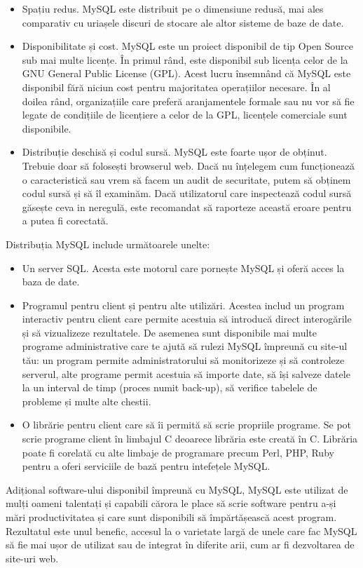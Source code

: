 \documentclass[12pt]{book}
\begin{document}
\begin{addmargin}[4em]{1em}
\begin{itemize}
	\item Spațiu redus. MySQL este distribuit pe o dimensiune redusă, mai ales comparativ cu uriașele discuri de stocare ale altor sisteme de baze de date.
	\item Disponibilitate și cost. MySQL este un proiect disponibil de tip Open Source sub mai multe licențe. În primul rând, este disponibil sub licența celor de la GNU General Public License (GPL). Acest lucru însemnând că MySQL este disponibil fără niciun cost pentru majoritatea operațiilor necesare. În al doilea rând, organizațiile care preferă aranjamentele formale sau nu vor să fie legate de condițiile de licențiere a celor de la GPL, licențele comerciale sunt disponibile.
	\item Distribuție deschisă și codul sursă. MySQL este foarte ușor de obținut. Trebuie doar să folosești browserul web. Dacă nu înțelegem cum funcționează o caracteristică sau vrem să facem un audit de securitate, putem să obținem codul sursă și să îl examinăm. Dacă utilizatorul care inspectează codul sursă găsește ceva in neregulă, este recomandat să raporteze această eroare pentru a putea fi corectată.\cite{mySqlDeveloperLibrary}
\end{itemize}
\end{addmargin}
\bigbreak
Distribuția MySQL include următoarele unelte:
\begin{addmargin}[4em]{1em}
\begin{itemize}
\item Un server SQL. Acesta este motorul care pornește MySQL și oferă acces la baza de date.
\item Programul pentru client și pentru alte utilizări. Acestea includ un program interactiv pentru client care permite acestuia să introducă direct interogările și să vizualizeze rezultatele. De asemenea sunt disponibile mai multe programe administrative care te ajută să rulezi MySQL împreună cu site-ul tău: un program permite administratorului să monitorizeze și să controleze serverul, alte programe permit acestuia să importe date, să își salveze datele la un interval de timp (proces numit back-up), să verifice tabelele de probleme și multe alte chestii.
\item O librărie pentru client care să îi permită să scrie propriile programe. Se pot scrie programe client în limbajul C deoarece librăria este creată în C. Librăria poate fi corelată cu alte limbaje de programare precum Perl, PHP, Ruby pentru a oferi serviciile de bază pentru intefețele MySQL.\cite{mySqlDeveloperLibrary}
\end{itemize}
\end{addmargin}
\bigbreak
Adițional software-ului disponibil împreună cu MySQL, MySQL este utilizat de mulți oameni talentați și capabili cărora le place să scrie software pentru a-și mări productivitatea și care sunt disponibili să împărtășească acest program. Rezultatul este unul benefic, accesul la o varietate largă de unele care fac MySQL să fie mai ușor de utilizat sau de integrat în diferite arii, cum ar fi dezvoltarea de site-uri web. \cite{mySqlDeveloperLibrary}
\end{document}
